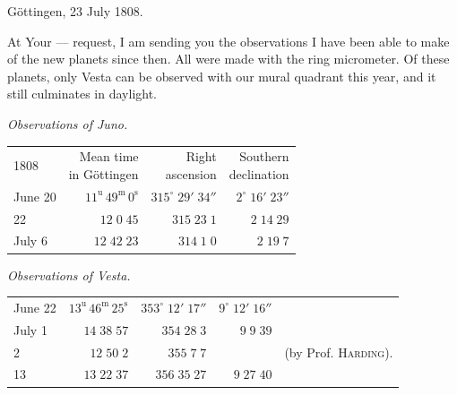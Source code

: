 \begin{flushright}
Göttingen, 23 July 1808.
\end{flushright}

\par\indent At Your --- request, I am sending you the observations I have been able to make of the new planets since then. All were made with the ring micrometer. Of these planets, only Vesta can be observed with our mural quadrant this year, and it still culminates in daylight.

\begin{center}\emph{Observations of Juno.}\end{center}

\begin{center}\fontsize{10}{12}\selectfont\setlength{\tabcolsep}{3pt}\renewcommand{\arraystretch}{1.15}\begin{tabular}{lrrr}
1808 & \shortstack{Mean time\\in Göttingen} & \shortstack{Right\\ascension} & \shortstack{Southern\\declination}\\
June 20 & $11^{\text{u}}\,49^{\text{m}}\,0^{\text{s}}$ & $315^\circ\;29'\;34''$ & $2^\circ\;16'\;23''$\\
22 & $12\;0\;45$ & $315\;23\;1$ & $2\;14\;29$\\
July 6 & $12\;42\;23$ & $314\;1\;0$ & $2\;19\;7$\\
\end{tabular}\end{center}

\begin{center}\emph{Observations of Vesta.}\end{center}

\begin{center}\fontsize{9}{12}\selectfont\setlength{\tabcolsep}{3pt}\renewcommand{\arraystretch}{1.15}\begin{tabular}{lrrrl}
June 22 & $13^{\text{u}}\,46^{\text{m}}\,25^{\text{s}}$ & $353^\circ\;12'\;17''$ & $9^\circ\;12'\;16''$ & \\
July 1 & $14\;38\;57$ & $354\;28\;3$ & $9\;9\;39$ & \\
2 & $12\;50\;2$ & $355\;7\;7$ & & (by Prof. \textsc{Harding}).\\
13 & $13\;22\;37$ & $356\;35\;27$ & $9\;27\;40$ & \\
\end{tabular}\end{center}

